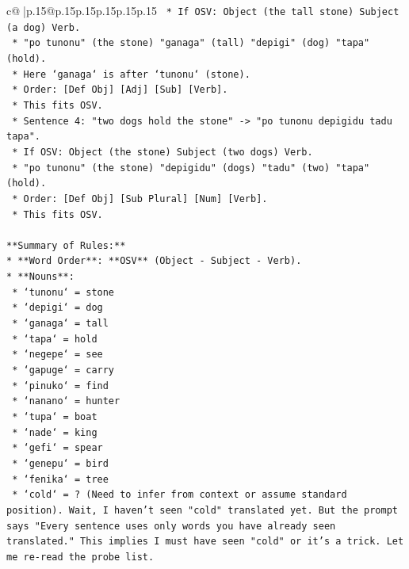 \documentclass{article}
\begin{document}
{\begin{supertabular}{c@{$\;$}|p{.15\linewidth}@{}p{.15\linewidth}p{.15\linewidth}p{.15\linewidth}p{.15\linewidth}p{.15\linewidth}}
{{{\texttt{        *   If OSV: Object (the tall stone) Subject (a dog) Verb.} \\
\texttt{        *   "po tunonu" (the stone) "ganaga" (tall) "depigi" (dog) "tapa" (hold).} \\
\texttt{        *   Here `ganaga` is after `tunonu` (stone).} \\
\texttt{        *   Order: {[}Def Obj{]} {[}Adj{]} {[}Sub{]} {[}Verb{]}.} \\
\texttt{        *   This fits OSV.} \\
\texttt{    *   Sentence 4: "two dogs hold the stone" {-}> "po tunonu depigidu tadu tapa".} \\
\texttt{        *   If OSV: Object (the stone) Subject (two dogs) Verb.} \\
\texttt{        *   "po tunonu" (the stone) "depigidu" (dogs) "tadu" (two) "tapa" (hold).} \\
\texttt{        *   Order: {[}Def Obj{]} {[}Sub Plural{]} {[}Num{]} {[}Verb{]}.} \\
\texttt{        *   This fits OSV.} \\
\\ 
\texttt{**Summary of Rules:**} \\
\texttt{*   **Word Order**: **OSV** (Object {-} Subject {-} Verb).} \\
\texttt{*   **Nouns**:} \\
\texttt{    *   `tunonu` = stone} \\
\texttt{    *   `depigi` = dog} \\
\texttt{    *   `ganaga` = tall} \\
\texttt{    *   `tapa` = hold} \\
\texttt{    *   `negepe` = see} \\
\texttt{    *   `gapuge` = carry} \\
\texttt{    *   `pinuko` = find} \\
\texttt{    *   `nanano` = hunter} \\
\texttt{    *   `tupa` = boat} \\
\texttt{    *   `nade` = king} \\
\texttt{    *   `gefi` = spear} \\
\texttt{    *   `genepu` = bird} \\
\texttt{    *   `fenika` = tree} \\
\texttt{    *   `cold` = ? (Need to infer from context or assume standard position). Wait, I haven't seen "cold" translated yet. But the prompt says "Every sentence uses only words you have already seen translated." This implies I must have seen "cold" or it's a trick. Let me re{-}read the probe list.} \\
}}}
\end{supertabular}}
\end{document}
